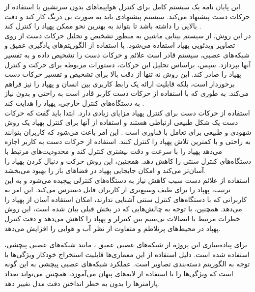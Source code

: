 این پایان نامه یک سیستم کامل برای کنترل هواپیماهای بدون سرنشین 
با استفاده از حرکات دست پیشنهاد می‌کند. سیستم پیشنهادی باید به صورت بی درنگ   کار کند و دقت بالایی را داشته باشد تا بتواند به بهترین نحو ممکن پهپاد را کنترل کند \cite{hadri2018hand}.
\\
در این روش، از سیستم بینایی ماشین به منظور تشخیص و تحلیل حرکات دست از روی تصاویر ویدئویی پهپاد استفاده می‌شود. با استفاده از الگوریتم‌های یادگیری عمیق و شبکه‌های عصبی، سیستم 
قادر است علائم و حرکات دست را تشخیص داده و به تفسیر آنها بپردازد. سپس، براساس تحلیل این حرکات، دستورات مربوطه برای حرکت و کنترل پهپاد را صادر کند.
 این روش نه تنها از دقت بالا برای تشخیص و تفسیر حرکات دست برخوردار است، بلکه قابلیت ارائه یک رابط کاربری بین انسان و پهپاد را نیز فراهم می‌کند. 
به طوری که با استفاده از حرکات دست کاربر قادر است به راحتی و بدون نیاز به دستگاه‌های کنترل خارجی، پهپاد را هدایت کند \cite{yoo2022motion}.
\\
استفاده از حرکات دست برای کنترل پهپاد مزایای زیادی دارد. ابتدا باید گفت که حرکات دست یک شکل طبیعی ارتباطی هستند و استفاده از آنها برای کنترل پهپاد یک روش شهودی و طبیعی برای تعامل با فناوری است
. این امر باعث می‌شود که کاربران بتوانند به راحتی و با کمترین تلاش پهپاد را کنترل کنند. استفاده از حرکات دست به کاربر اجازه می‌دهد پهپاد را با سرعت و دقت
بیشتری کنترل کند و محدودیت‌های مرتبط با دستگاه‌های کنترل سنتی را کاهش دهد. همچنین، این روش حرکت و دنبال کردن پهپاد را آسان‌تر می‌کند و امکان جابجایی پهپاد در فضا‌های باز را بهبود می‌بخشد.
\\
استفاده از علائم دست سبب کاهش نیاز به دستگاه‌های کنترلی پیچیده می‌شود و به این ترتیب، پهپاد را برای طیف وسیع‌تری از کاربران قابل دسترس می‌کند.
این امر به کاربرانی که با دستگاه‌های کنترل سنتی آشنایی ندارند، امکان استفاده آسان از پهپاد را می‌دهد. همچنین، با توجه به چالش‌هایی که در بخش قبلی بیان شده است، 
این روش خطرات مرتبط با اتصالات بی‌سیم بین کنترلر و پهپاد را کاهش می‌دهد و دقت کنترل پهپاد در محیط‌های پرتلاطم و متفاوت از نظر آب و هوایی را افزایش می‌دهد. 


برای پیاده‌سازی این پروژه از شبکه‌های عصبی عمیق
، مانند شبکه‌های عصبی پیچشی، استفاده شده است. دلیل استفاده از این معماری‌ها قابلیت استخراج خودکار ویژگی‌ها با توجه به الگوریتم دسته‌بندی تصاویر
است. عملکرد شبکه‌های عصبی پیچشی به این گونه است که ویژگی‌ها را با استفاده از  لایه‌های پنهان
می‌آموزد، همچنین می‌تواند تعداد پارامترها را بدون به خطر انداختن دقت مدل تغییر دهد.

